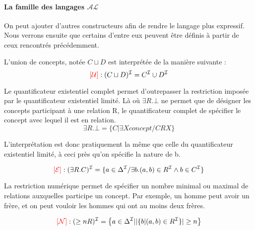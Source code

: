 \paragraph{La famille des langages $\mathcal{AL}$}
\label{sec:la-famille-des}

\par On peut ajouter d'autres constructeurs afin de rendre le langage plus expressif. Nous verrons ensuite que certains d'entre eux peuvent être définis à partir de ceux rencontrés précédemment.

\par L'union de concepts, notée $C \sqcup D$ est interprétée de la manière suivante :
\begin{displaymath}
  \textcolor{red}{[\mathcal{U}]} : (C \sqcup D)^\mathcal{I} = C^\mathcal{I} \cup D^\mathcal{I}
\end{displaymath}

\par Le quantificateur existentiel complet permet d'outrepasser la restriction imposée par le quantificateur existentiel limité. Là où $\exists R.\bot$ ne permet que de désigner les concepts participant à une relation R, le quantificateur complet de spécifier le concept avec lequel il est en relation.
\begin{displaymath}
  \exists R.\bot = \{C | \exists X concept / CRX\}
\end{displaymath}

\par L'interprétation est donc pratiquement la même que celle du quantificateur existentiel limité, à ceci près qu'on spécifie la nature de b.

\begin{displaymath}
  \textcolor{red}{[\mathcal{E}]} : ( \exists R.C )^\mathcal{I}  = \{ a \in \Delta^\mathcal{I} / \exists b.(a,b) \in R^\mathcal{I} \wedge b \in C^\mathcal{I} \}
\end{displaymath}

\par La restriction numérique permet de spécifier un nombre minimal ou maximal de relations auxquelles participe un concept. Par exemple, un homme peut avoir un frère, et on peut vouloir les hommes qui ont au moins deux frères.

\begin{displaymath}
  \textcolor{red}{[\mathcal{N}]} : ( \geq nR )^\mathcal{I}  = \left\{ a \in \Delta^\mathcal{I} | |\{b| (a,b) \in R^\mathcal{I}\}| \geq n \right\}
\end{displaymath}

